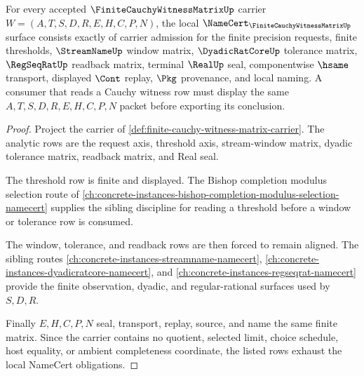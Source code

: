 \begin{theorem}
\label{thm:finite-cauchy-witness-matrix-namecert-obligations}
For every accepted $\FiniteCauchyWitnessMatrixUp$ carrier $W=(A,T,S,D,R,E,H,C,P,N)$, the local $\NameCert_{\FiniteCauchyWitnessMatrixUp}$ surface consists exactly of carrier admission for the finite precision requests, finite thresholds, $\StreamNameUp$ window matrix, $\DyadicRatCoreUp$ tolerance matrix, $\RegSeqRatUp$ readback matrix, terminal $\RealUp$ seal, componentwise $\hsame$ transport, displayed $\Cont$ replay, $\Pkg$ provenance, and local naming. A consumer that reads a Cauchy witness row must display the same $A,T,S,D,R,E,H,C,P,N$ packet before exporting its conclusion.
\end{theorem}
\begin{proof}
Project the carrier of \autoref{def:finite-cauchy-witness-matrix-carrier}. The analytic rows are the request axis, threshold axis, stream-window matrix, dyadic tolerance matrix, readback matrix, and Real seal.

The threshold row is finite and displayed. The Bishop completion modulus selection route of \autoref{ch:concrete-instances-bishop-completion-modulus-selection-namecert} supplies the sibling discipline for reading a threshold before a window or tolerance row is consumed.

The window, tolerance, and readback rows are then forced to remain aligned. The sibling routes \autoref{ch:concrete-instances-streamname-namecert}, \autoref{ch:concrete-instances-dyadicratcore-namecert}, and \autoref{ch:concrete-instances-regseqrat-namecert} provide the finite observation, dyadic, and regular-rational surfaces used by $S,D,R$.

Finally $E,H,C,P,N$ seal, transport, replay, source, and name the same finite matrix. Since the carrier contains no quotient, selected limit, choice schedule, host equality, or ambient completeness coordinate, the listed rows exhaust the local NameCert obligations.
\end{proof}

